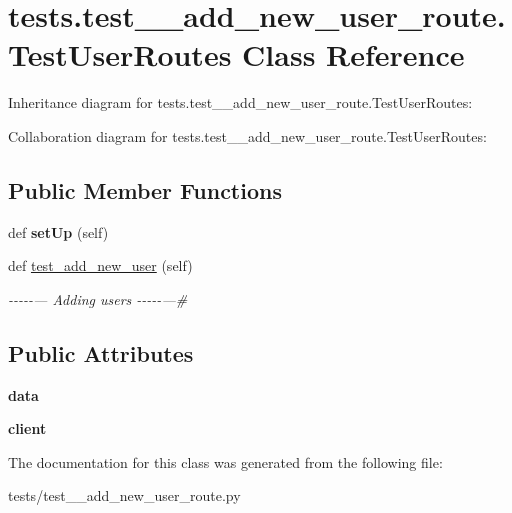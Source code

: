 \hypertarget{classtests_1_1test__1__add__new__user__route_1_1_test_user_routes}{}\section{tests.\+test\+\_\+\_\+add\+\_\+new\+\_\+user\+\_\+route.\+Test\+User\+Routes Class Reference}
\label{classtests_1_1test__1__add__new__user__route_1_1_test_user_routes}


Inheritance diagram for tests.\+test\+\_\+\_\+add\+\_\+new\+\_\+user\+\_\+route.\+Test\+User\+Routes\+:


Collaboration diagram for tests.\+test\+\_\+\_\+add\+\_\+new\+\_\+user\+\_\+route.\+Test\+User\+Routes\+:
\subsection*{Public Member Functions}
\begin{DoxyCompactItemize}
\item 
\mbox{\label{classtests_1_1test__1__add__new__user__route_1_1_test_user_routes_aea4e4849bb5076ccc22c20be643e6a0b}} 
def {\bfseries set\+Up} (self)
\item 
\mbox{\label{classtests_1_1test__1__add__new__user__route_1_1_test_user_routes_a7f6feef69e3a930caf8313357219fae1}} 
def \hyperlink{classtests_1_1test__1__add__new__user__route_1_1_test_user_routes_a7f6feef69e3a930caf8313357219fae1}{test\+\_\+add\+\_\+new\+\_\+user} (self)
\begin{DoxyCompactList}\small\item\em -\/-\/-\/-\/-\/--- Adding users -\/-\/-\/-\/-\/---\# \end{DoxyCompactList}\end{DoxyCompactItemize}
\subsection*{Public Attributes}
\begin{DoxyCompactItemize}
\item 
\mbox{\label{classtests_1_1test__1__add__new__user__route_1_1_test_user_routes_ae252557390d4acfdc978bff4b26ffeaa}} 
{\bfseries data}
\item 
\mbox{\label{classtests_1_1test__1__add__new__user__route_1_1_test_user_routes_a3a446edfe4af7dbc375d2ae69ae8bcac}} 
{\bfseries client}
\end{DoxyCompactItemize}


The documentation for this class was generated from the following file\+:\begin{DoxyCompactItemize}
\item 
tests/test\+\_\+\_\+add\+\_\+new\+\_\+user\+\_\+route.\+py\end{DoxyCompactItemize}
